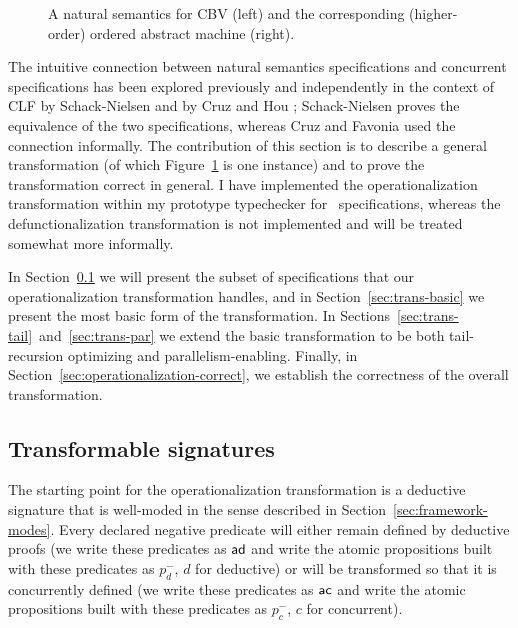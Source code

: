 \begin{figure}
\begin{minipage}[b]{0.36\linewidth}
\end{minipage}
\hspace{0.5cm}
\begin{minipage}[b]{0.64\linewidth}
\end{minipage}
\caption{A natural semantics for CBV (left) and the corresponding (higher-order)
  ordered abstract machine (right).}
\label{fig:example-transform-cbv}
\end{figure}

The intuitive connection between natural semantics specifications and
concurrent specifications has been explored previously and
independently in the context of CLF by Schack-Nielsen
\cite{schacknielsen07induction} and by Cruz and Hou
\cite{cruz12parallel}; Schack-Nielsen proves the equivalence of the
two specifications, whereas Cruz and Favonia used the connection
informally. The contribution of this section is to describe a general
transformation (of which Figure~\ref{fig:example-transform-cbv} is one
instance) and to prove the transformation correct in general. I have
implemented the operationalization transformation within my prototype
typechecker for \sls~specifications, whereas the defunctionalization 
transformation is not implemented and will be treated somewhat more
informally.

In Section~\ref{sec:trans-subset} we will present the subset of
specifications that our operationalization transformation handles, and
in Section~\ref{sec:trans-basic} we present the most basic form of the
transformation.  In
Sections~\ref{sec:trans-tail}~and~\ref{sec:trans-par} we extend the
basic transformation to be both tail-recursion optimizing and
parallelism-enabling. Finally, in
Section~\ref{sec:operationalization-correct}, we establish the
correctness of the overall transformation.

\subsection{Transformable signatures}
\label{sec:trans-subset}

The starting point for the operationalization transformation is a
deductive signature that is well-moded in the sense described in
Section~\ref{sec:framework-modes}. Every declared negative predicate
will either remain defined by deductive proofs (we write these
predicates as ${\sf ad}$ and write the atomic propositions built with
these predicates as $p_d^-$, $d$ for deductive) or will be transformed
so that it is concurrently defined (we write these predicates as ${\sf
  ac}$ and write the atomic propositions built with these predicates
as $p_c^-$, $c$ for concurrent).

